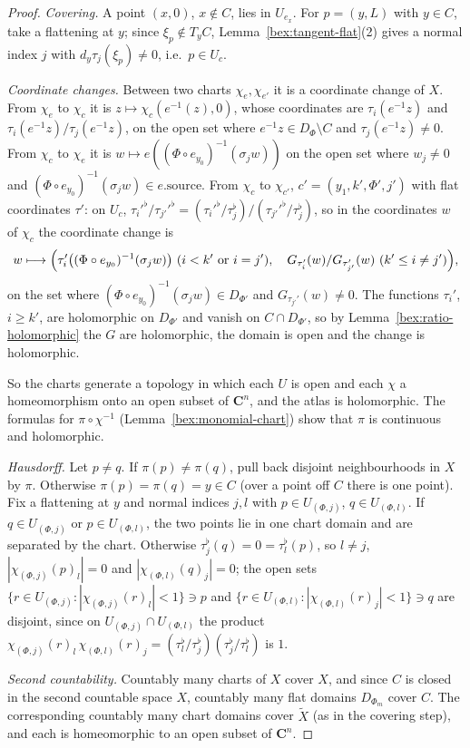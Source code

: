 \begin{proof}
\leanok
\emph{Covering.} A point \((x,0)\), \(x\notin C\), lies in \(U_{e_x}\). For \(p=(y,L)\) with \(y\in C\), take a flattening at \(y\); since
\(\xi_p\notin T_yC\), Lemma~\ref{bex:tangent-flat}(2) gives a normal index \(j\) with \(d_y\tau_j(\xi_p)\ne0\), i.e.\ \(p\in U_c\).

\emph{Coordinate changes.} Between two charts \(\chi_e,\chi_{e'}\) it is a coordinate change of \(X\). From \(\chi_e\) to \(\chi_c\) it is
\(z\mapsto\chi_c(e^{-1}(z),0)\), whose coordinates are \(\tau_i(e^{-1}z)\) and \(\tau_i(e^{-1}z)/\tau_j(e^{-1}z)\), on the open set where
\(e^{-1}z\in D_\Phi\setminus C\) and \(\tau_j(e^{-1}z)\ne0\). From \(\chi_c\) to \(\chi_e\) it is \(w\mapsto e((\Phi\circ e_{y_0})^{-1}(\sigma_j w))\) on the
open set where \(w_j\ne0\) and \((\Phi\circ e_{y_0})^{-1}(\sigma_jw)\in e.\mathrm{source}\). From \(\chi_c\) to \(\chi_{c'}\), \(c'=(y_1,k',\Phi',j')\) with
flat coordinates \(\tau'\): on \(U_c\), \(\tau_i'^\flat/\tau_{j'}'^\flat=(\tau_i'^\flat/\tau_j^\flat)/(\tau_{j'}'^\flat/\tau_j^\flat)\), so in the coordinates \(w\) of
\(\chi_c\) the coordinate change is
\[
 w\longmapsto\Bigl(\tau_i'\bigl((\Phi\circ e_{y_0})^{-1}(\sigma_jw)\bigr)\ (i<k'\text{ or }i=j'),\quad G_{\tau_i'}(w)/G_{\tau_{j'}'}(w)\ (k'\le i\ne j')\Bigr),
\]
on the set where \((\Phi\circ e_{y_0})^{-1}(\sigma_jw)\in D_{\Phi'}\) and \(G_{\tau_{j'}'}(w)\ne0\). The functions \(\tau_i'\), \(i\ge k'\), are holomorphic on
\(D_{\Phi'}\) and vanish on \(C\cap D_{\Phi'}\), so by Lemma~\ref{bex:ratio-holomorphic} the \(G\) are holomorphic, the domain is open and the change
is holomorphic.

So the charts generate a topology in which each \(U\) is open and each \(\chi\) a homeomorphism onto an open subset of \(\mathbf C^n\), and the atlas
is holomorphic. The formulas for \(\pi\circ\chi^{-1}\) (Lemma~\ref{bex:monomial-chart}) show that \(\pi\) is continuous and holomorphic.

\emph{Hausdorff.} Let \(p\ne q\). If \(\pi(p)\ne\pi(q)\), pull back disjoint neighbourhoods in \(X\) by \(\pi\). Otherwise \(\pi(p)=\pi(q)=y\in C\)
(over a point off \(C\) there is one point). Fix a flattening at \(y\) and normal indices \(j,l\) with \(p\in U_{(\Phi,j)}\), \(q\in U_{(\Phi,l)}\). If
\(q\in U_{(\Phi,j)}\) or \(p\in U_{(\Phi,l)}\), the two points lie in one chart domain and are separated by the chart. Otherwise
\(\tau_j^\flat(q)=0=\tau_l^\flat(p)\), so \(l\ne j\), \(|\chi_{(\Phi,j)}(p)_l|=0\) and \(|\chi_{(\Phi,l)}(q)_j|=0\); the open sets
\(\{r\in U_{(\Phi,j)}:|\chi_{(\Phi,j)}(r)_l|<1\}\ni p\) and \(\{r\in U_{(\Phi,l)}:|\chi_{(\Phi,l)}(r)_j|<1\}\ni q\) are disjoint, since on
\(U_{(\Phi,j)}\cap U_{(\Phi,l)}\) the product \(\chi_{(\Phi,j)}(r)_l\,\chi_{(\Phi,l)}(r)_j=(\tau_l^\flat/\tau_j^\flat)(\tau_j^\flat/\tau_l^\flat)\) is \(1\).

\emph{Second countability.} Countably many charts of \(X\) cover \(X\), and since \(C\) is closed in the second countable space \(X\),
countably many flat domains \(D_{\Phi_m}\) cover \(C\). The corresponding countably many chart domains cover \(\tilde X\) (as in the covering step), and
each is homeomorphic to an open subset of \(\mathbf C^n\).
\end{proof}

